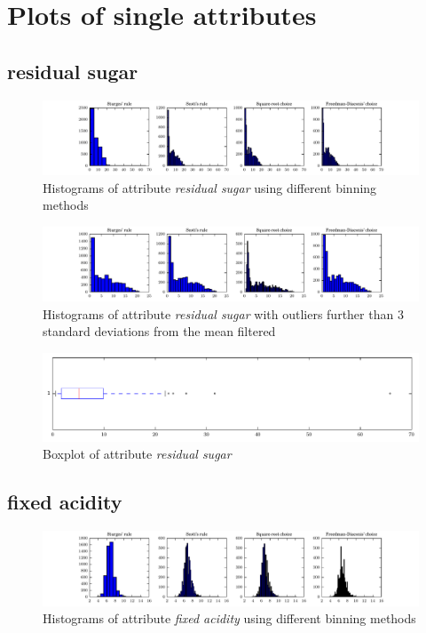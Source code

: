 \documentclass{report}
\begin{document}
\section{Plots of single attributes}

\subsection{residual sugar}
\begin{figure}[H]
\includegraphics[width=\textwidth]{histograms/residual_sugar.pdf}
\caption{Histograms of attribute \emph{residual sugar} using different binning methods}\end{figure}

\begin{figure}[H]
\includegraphics[width=\textwidth]{histograms/residual_sugar_filtered.pdf}
\caption{Histograms of attribute \emph{residual sugar} with outliers further than 3 standard deviations from the mean filtered}
\end{figure}

\begin{figure}[H]
\includegraphics[width=\textwidth]{boxplots/residual_sugar.pdf}
\caption{Boxplot of attribute \emph{residual sugar}}\end{figure}

\newpage\subsection{fixed acidity}
\begin{figure}[H]
\includegraphics[width=\textwidth]{histograms/fixed_acidity.pdf}
\caption{Histograms of attribute \emph{fixed acidity} using different binning methods}\end{figure}
\end{document}
